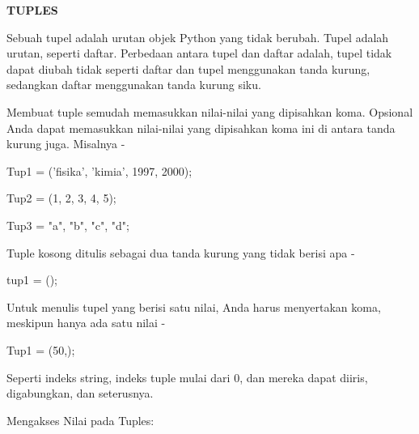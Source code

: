 \documentclass[a4paper,12pt]{report}
\begin{document}
\sloppy
\begin{center}{\fontsize{14pt}{14pt}\selectfont \textbf{TUPLES} \\}\end{center} \par
\noindent 
{\fontsize{14pt}{14pt}\selectfont Sebuah tupel adalah urutan objek Python yang tidak berubah. Tupel adalah urutan, seperti daftar. Perbedaan antara tupel dan daftar adalah, tupel tidak dapat diubah tidak seperti daftar dan tupel menggunakan tanda kurung, sedangkan daftar menggunakan tanda kurung siku. \\} \par
\noindent 
{\fontsize{14pt}{14pt}\selectfont Membuat tuple semudah memasukkan nilai-nilai yang dipisahkan koma. Opsional Anda dapat memasukkan nilai-nilai yang dipisahkan koma ini di antara tanda kurung juga. Misalnya - \\} \par
\noindent 
\vspace{14pt}
\noindent 
{\fontsize{14pt}{14pt}\selectfont Tup1 = ('fisika', 'kimia', 1997, 2000); \\} \par
\noindent 
{\fontsize{14pt}{14pt}\selectfont Tup2 = (1, 2, 3, 4, 5); \\} \par
\noindent 
{\fontsize{14pt}{14pt}\selectfont Tup3 = "a", "b", "c", "d"; \\} \par
\noindent 
{\fontsize{14pt}{14pt}\selectfont Tuple kosong ditulis sebagai dua tanda kurung yang tidak berisi apa - \\} \par
\noindent 
{\fontsize{14pt}{14pt}\selectfont tup1 = (); \\} \par
\noindent 
{\fontsize{14pt}{14pt}\selectfont Untuk menulis tupel yang berisi satu nilai, Anda harus menyertakan koma, meskipun hanya ada satu nilai - \\} \par
\noindent 
{\fontsize{14pt}{14pt}\selectfont Tup1 = (50,); \\} \par
\noindent 
{\fontsize{14pt}{14pt}\selectfont Seperti indeks string, indeks tuple mulai dari 0, dan mereka dapat diiris, digabungkan, dan seterusnya. \\} \par
\noindent 
{\fontsize{14pt}{14pt}\selectfont Mengakses Nilai pada Tuples: \\} \par
\end{document}
